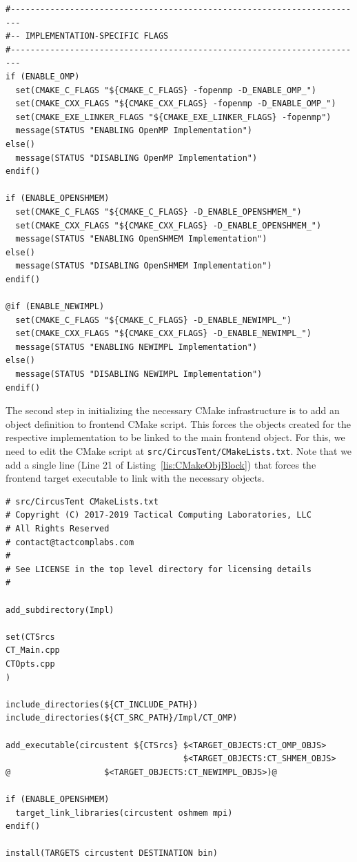 \documentclass{article}
\begin{document}
\vspace{0.125in}
\begin{lstlisting}[frame=single,style=base,caption={CMake Logic Block},captionpos=b,label={lis:CMakeLogicBlock}]
#------------------------------------------------------------------------
#-- IMPLEMENTATION-SPECIFIC FLAGS
#------------------------------------------------------------------------
if (ENABLE_OMP)
  set(CMAKE_C_FLAGS "${CMAKE_C_FLAGS} -fopenmp -D_ENABLE_OMP_")
  set(CMAKE_CXX_FLAGS "${CMAKE_CXX_FLAGS} -fopenmp -D_ENABLE_OMP_")
  set(CMAKE_EXE_LINKER_FLAGS "${CMAKE_EXE_LINKER_FLAGS} -fopenmp")
  message(STATUS "ENABLING OpenMP Implementation")
else()
  message(STATUS "DISABLING OpenMP Implementation")
endif()

if (ENABLE_OPENSHMEM)
  set(CMAKE_C_FLAGS "${CMAKE_C_FLAGS} -D_ENABLE_OPENSHMEM_")
  set(CMAKE_CXX_FLAGS "${CMAKE_CXX_FLAGS} -D_ENABLE_OPENSHMEM_")
  message(STATUS "ENABLING OpenSHMEM Implementation")
else()
  message(STATUS "DISABLING OpenSHMEM Implementation")
endif()

@if (ENABLE_NEWIMPL)
  set(CMAKE_C_FLAGS "${CMAKE_C_FLAGS} -D_ENABLE_NEWIMPL_")
  set(CMAKE_CXX_FLAGS "${CMAKE_CXX_FLAGS} -D_ENABLE_NEWIMPL_")
  message(STATUS "ENABLING NEWIMPL Implementation")
else()
  message(STATUS "DISABLING NEWIMPL Implementation")
endif()
\end{lstlisting}

The second step in initializing the necessary CMake infrastructure is to add 
an object definition to frontend CMake script.  This forces the objects created for the 
respective implementation to be linked to the main frontend object.  For this, 
we need to edit the CMake script at \texttt{src/CircusTent/CMakeLists.txt}.  Note that 
we add a single line (Line 21 of Listing~\ref{lis:CMakeObjBlock}) that forces the 
frontend target executable to link with the necessary objects.  

\clearpage
\vspace{0.125in}
\begin{lstlisting}[frame=single,style=base,caption={CMake Object Block},captionpos=b,label={lis:CMakeObjBlock}]
# src/CircusTent CMakeLists.txt
# Copyright (C) 2017-2019 Tactical Computing Laboratories, LLC
# All Rights Reserved
# contact@tactcomplabs.com
#
# See LICENSE in the top level directory for licensing details
#

add_subdirectory(Impl)

set(CTSrcs
CT_Main.cpp
CTOpts.cpp
)

include_directories(${CT_INCLUDE_PATH})
include_directories(${CT_SRC_PATH}/Impl/CT_OMP)

add_executable(circustent ${CTSrcs} $<TARGET_OBJECTS:CT_OMP_OBJS>
                                    $<TARGET_OBJECTS:CT_SHMEM_OBJS>
@				    $<TARGET_OBJECTS:CT_NEWIMPL_OBJS>)@

if (ENABLE_OPENSHMEM)
  target_link_libraries(circustent oshmem mpi)
endif()

install(TARGETS circustent DESTINATION bin)
\end{lstlisting}
\end{document}
